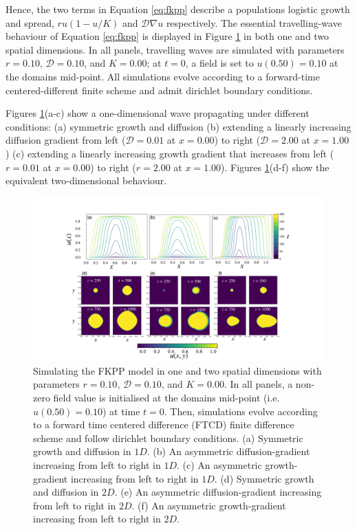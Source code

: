 Hence, the two terms in Equation \ref{eq:fkpp} describe a populations logistic growth and spread, $ru(1 - u/K)$ and $\mathcal{D}\nabla u$ respectively.
The essential travelling-wave behaviour of Equation \ref{eq:fkpp} is displayed in Figure \ref{fig:fkpp} 
in both one and two spatial dimensions. In all panels, travelling waves are simulated 
with parameters $r=0.10$, $\mathcal{D}=0.10$, and $K=0.00$; at $t=0$, a field is set to $u(0.50)=0.10$ at the domains mid-point.
All simulations evolve according to a forward-time centered-different finite scheme and admit dirichlet boundary conditions.

Figures \ref{fig:fkpp}(a-c) show a one-dimensional wave propagating under different conditions:
(a) symmetric growth and diffusion
(b) extending a linearly increasing diffusion gradient from left ($\mathcal{D}=0.01$ at $x=0.00$) to right
($\mathcal{D}=2.00$ at $x=1.00$)
(c) extending a linearly increasing growth gradient that increases from left ($r=0.01$ at $x=0.00$) to right
($r=2.00$ at $x=1.00$).
Figures \ref{fig:fkpp}(d-f) show the equivalent two-dimensional behaviour.

\begin{figure}
    \centering
    \includegraphics[scale=0.325]{chapter2/figures/FKPP.pdf}
    \caption{
    Simulating the FKPP model in one and two spatial dimensions with parameters $r=0.10$, $\mathcal{D}=0.10$, and $K=0.00$. 
    In all panels, a non-zero field value is initialised at the domains mid-point (i.e. $u(0.50)=0.10$) at time $t=0$.
    Then, simulations evolve according to a forward time centered difference (FTCD) finite difference scheme and
    follow dirichlet boundary conditions. 
    (a) Symmetric growth and diffusion in $1D$.
    (b) An asymmetric diffusion-gradient increasing from left to right in $1D$.
    (c) An asymmetric growth-gradient increasing from left to right in $1D$.
    (d) Symmetric growth and diffusion in $2D$.
    (e) An asymmetric diffusion-gradient increasing from left to right in $2D$.
    (f) An asymmetric growth-gradient increasing from left to right in $2D$.}
    \label{fig:fkpp}
\end{figure}

